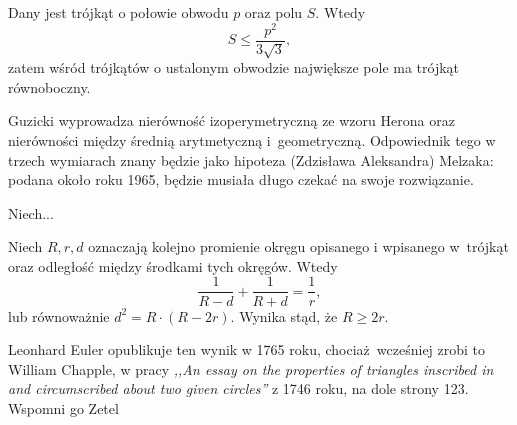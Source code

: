 
\begin{proposition}
	Dany jest trójkąt o połowie obwodu $p$ oraz polu $S$.
	Wtedy 
	\begin{equation}
		S \le \frac{p^2}{3 \sqrt 3},
	\end{equation}
	zatem wśród trójkątów o ustalonym obwodzie największe pole ma trójkąt równoboczny.
\end{proposition}

Guzicki \cite[s. 169, 170]{guzicki_2021} wyprowadza nierówność izoperymetryczną ze wzoru Herona oraz nierówności między średnią arytmetyczną i~geometryczną.
%
Odpowiednik tego w trzech wymiarach znany będzie jako hipoteza (Zdzisława Aleksandra) Melzaka: podana około roku 1965, będzie musiała długo czekać na swoje rozwiązanie.
%

\begin{proposition}
	Niech... %
\end{proposition}

\begin{proposition}
%
	Niech $R, r, d$ oznaczają kolejno promienie okręgu opisanego i wpisanego w~trójkąt oraz odległość między środkami tych okręgów.
	Wtedy
	\begin{equation}
	\frac{1}{R-d} + \frac{1}{R+d} = \frac 1 r,
	\end{equation}
	lub równoważnie $d^2 = R \cdot (R - 2r)$.
	Wynika stąd, że $R \ge 2r$.
\end{proposition}

Leonhard Euler opublikuje ten wynik w 1765 roku, chociaż wcześniej zrobi to William Chapple, w pracy \emph{,,An essay on the properties of triangles inscribed in and circumscribed about two given circles''} z 1746 roku, na dole strony 123.
Wspomni go Zetel \cite[s. 75]{zetel_2020}

